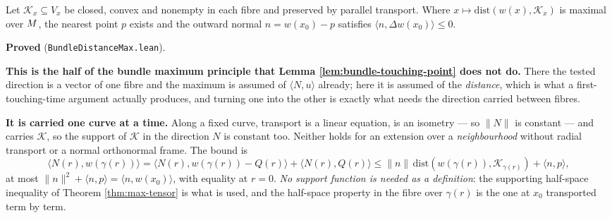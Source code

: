 \begin{lemma}
  \label{lem:bundle-distance-max}
  \leanok
  Let $\mathcal{K}_x \subseteq V_x$ be closed, convex and nonempty in each fibre and preserved
  by parallel transport. Where $x \mapsto \mathrm{dist}(w(x),\mathcal{K}_x)$ is maximal over
  $M$, the nearest point $p$ exists and the outward normal $n = w(x_0)-p$ satisfies
  $\langle n, \Delta w(x_0)\rangle \le 0$.

  \textbf{Proved} (\texttt{BundleDistanceMax.lean}).

  \textbf{This is the half of the bundle maximum principle that Lemma
  \ref{lem:bundle-touching-point} does not do.} There the tested direction is a vector of one
  fibre and the maximum is assumed of $\langle N,u\rangle$ already; here it is assumed of the
  \emph{distance}, which is what a first-touching-time argument actually produces, and turning
  one into the other is exactly what needs the direction carried between fibres.

  \textbf{It is carried one curve at a time.} Along a fixed curve, transport is a linear
  equation, is an isometry --- so $\|N\|$ is constant --- and carries $\mathcal{K}$, so the
  support of $\mathcal{K}$ in the direction $N$ is constant too. Neither holds for an
  extension over a \emph{neighbourhood} without radial transport or a normal orthonormal
  frame. The bound is
  \[
    \langle N(r), w(\gamma(r))\rangle
      = \langle N(r), w(\gamma(r)) - Q(r)\rangle + \langle N(r), Q(r)\rangle
      \le \|n\|\,\mathrm{dist}(w(\gamma(r)),\mathcal{K}_{\gamma(r)}) + \langle n,p\rangle,
  \]
  at most $\|n\|^2 + \langle n,p\rangle = \langle n, w(x_0)\rangle$, with equality at $r=0$.
  \emph{No support function is needed as a definition}: the supporting half-space inequality
  of Theorem \ref{thm:max-tensor} is what is used, and the half-space property in the fibre
  over $\gamma(r)$ is the one at $x_0$ transported term by term.
\end{lemma}

